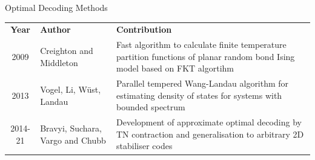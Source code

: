 \documentclass{dfki}
\begin{document}
\begin{frame}{Optimal Decoding Methods}
	\vspace{-15pt}
	\begin{table}[h]
        \renewcommand{\arraystretch}{1.5} %
        \small
		\begin{tabular}{c|p{4cm}|p{7cm}}
			\textbf{Year} & \textbf{Author} & \textbf{Contribution} \\
			2009 & Creighton and Middleton \cite{thomas_exact_2009,thomas_numerically_2013} & Fast algorithm to calculate finite temperature partition functions of planar random bond Ising model based on FKT algortihm \cite{kasteleyn_statistics_1961,temperley_dimer_1961} \\
			2013 & Vogel, Li, Wüst, Landau \cite{vogel_generic_2013} & Parallel tempered Wang-Landau algorithm \cite{wang_efficient_2001} for estimating density of states for systems with bounded spectrum \\
			2014-21 & Bravyi, Suchara, Vargo and Chubb \cite{bravyi_efficient_2014, chubb_general_2021} & Development of approximate optimal decoding by TN contraction and generalisation to arbitrary 2D stabiliser codes \\
		\end{tabular}
	\end{table}
\end{frame}
\end{document}
